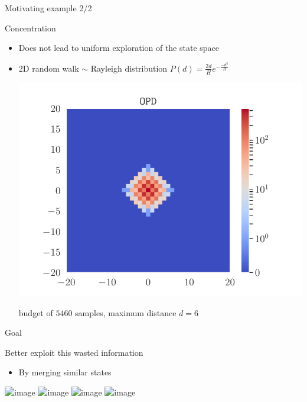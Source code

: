 \documentclass[slideopt,A4,showboxes,svgnames]{beamer}
\begin{document}
\begin{frame}{Motivating example 2/2}
\begin{alertblock}{Concentration}
\begin{itemize}[<+->]
\item Does not lead to uniform exploration of the state space
\item 2D random walk $\sim$ Rayleigh distribution
$P(d) = \frac{2d}{H}e^{-\frac{-d^2}{H}}$
\pause

\begin{center}
	\includegraphics[width=0.6\linewidth]{../img/occupations_OPD}
	
	budget of $5460$ samples, maximum distance $d=6$
\end{center}
\end{itemize}
\end{alertblock}
\end{frame}

\begin{frame}{Goal}
\begin{exampleblock}{Better exploit this wasted information}
	\begin{itemize}
		\item<2-4> By \alert{merging} similar states \only<3>{into a {\green graph}}
	\end{itemize}
	\begin{center}
		\includegraphics<1>[trim={1.8cm 2.2cm 1.9cm 2.7cm}, clip, width=0.55\linewidth]{img/tree_simple}%
		\includegraphics<2>[trim={1.8cm 2.2cm 1.9cm 2.7cm}, clip, width=0.55\linewidth]{img/tree_merging}%
		\includegraphics<3>[trim={1.8cm 2.2cm 1.9cm 2.7cm}, clip, width=0.55\linewidth]{img/tree_merged}%
		\includegraphics<4>[trim={1.8cm 1.2cm 1.9cm 0.8cm}, clip, width=0.55\linewidth]{img/graph_simple}%
	\end{center}
\end{exampleblock}
\end{frame}
\end{document}
